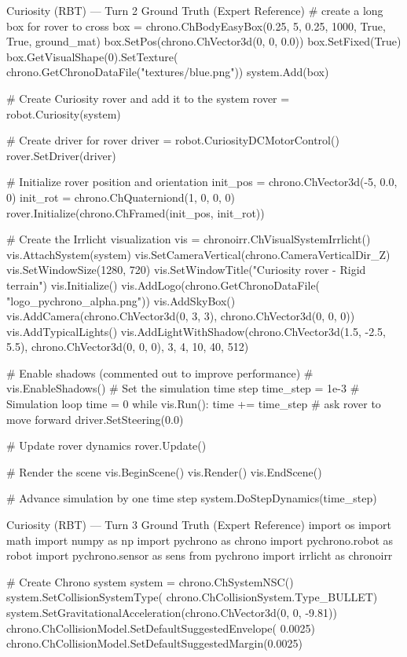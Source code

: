 \documentclass{ieeeaccess}
\begin{document}
\begin{appendices}
\begin{CodeBlock}{Curiosity (RBT) --- Turn 2 Ground Truth (Expert Reference)}
# create a long box for rover to cross
box = chrono.ChBodyEasyBox(0.25, 5, 0.25, 1000, True, True, ground_mat)
box.SetPos(chrono.ChVector3d(0, 0, 0.0))
box.SetFixed(True)
box.GetVisualShape(0).SetTexture(
    chrono.GetChronoDataFile("textures/blue.png"))
system.Add(box)

# Create Curiosity rover and add it to the system
rover = robot.Curiosity(system)

# Create driver for rover
driver = robot.CuriosityDCMotorControl()
rover.SetDriver(driver)

# Initialize rover position and orientation
init_pos = chrono.ChVector3d(-5, 0.0, 0)
init_rot = chrono.ChQuaterniond(1, 0, 0, 0)
rover.Initialize(chrono.ChFramed(init_pos, init_rot))

# Create the Irrlicht visualization
vis = chronoirr.ChVisualSystemIrrlicht()
vis.AttachSystem(system)
vis.SetCameraVertical(chrono.CameraVerticalDir_Z)
vis.SetWindowSize(1280, 720)
vis.SetWindowTitle("Curiosity rover - Rigid terrain")
vis.Initialize()
vis.AddLogo(chrono.GetChronoDataFile(
    "logo_pychrono_alpha.png"))
vis.AddSkyBox()
vis.AddCamera(chrono.ChVector3d(0, 3, 3), chrono.ChVector3d(0, 0, 0))
vis.AddTypicalLights()
vis.AddLightWithShadow(chrono.ChVector3d(1.5, -2.5, 5.5), chrono.ChVector3d(0, 0, 0), 3, 4, 10, 40, 512)

# Enable shadows (commented out to improve performance)
# vis.EnableShadows()
# Set the simulation time step
time_step = 1e-3
# Simulation loop
time = 0
while vis.Run():
    time += time_step
    # ask rover to move forward
    driver.SetSteering(0.0)

    # Update rover dynamics
    rover.Update()

    # Render the scene
    vis.BeginScene()
    vis.Render()
    vis.EndScene()

    # Advance simulation by one time step
    system.DoStepDynamics(time_step)
\end{CodeBlock}

\begin{CodeBlock}[breakable]{Curiosity (RBT) --- Turn 3 Ground Truth (Expert Reference)}
import os
import math
import numpy as np
import pychrono as chrono
import pychrono.robot as robot
import pychrono.sensor as sens
from pychrono import irrlicht as chronoirr

# Create Chrono system
system = chrono.ChSystemNSC()
system.SetCollisionSystemType(
    chrono.ChCollisionSystem.Type_BULLET)
system.SetGravitationalAcceleration(chrono.ChVector3d(0, 0, -9.81))
chrono.ChCollisionModel.SetDefaultSuggestedEnvelope(
    0.0025)
chrono.ChCollisionModel.SetDefaultSuggestedMargin(0.0025)


\end{CodeBlock}
\end{appendices}
\end{document}
